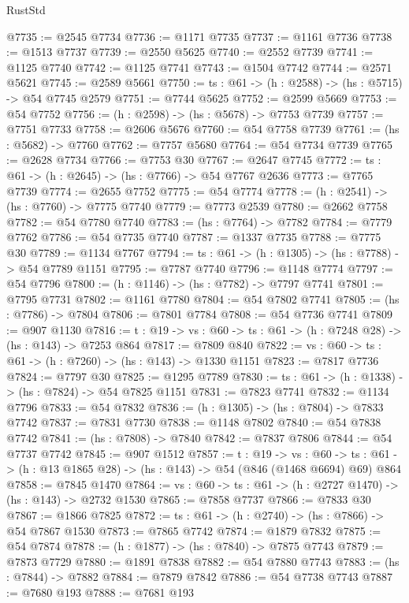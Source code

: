 \begin{lexlean}{RustStd}
\begin{coremodule}
@7735 := @2545 @7734
@7736 := @1171 @7735
@7737 := @1161 @7736
@7738 := @1513 @7737
@7739 := @2550 @5625
@7740 := @2552 @7739
@7741 := @1125 @7740
@7742 := @1125 @7741
@7743 := @1504 @7742
@7744 := @2571 @5621
@7745 := @2589 @5661
@7750 := {ts : @61} -> (h : @2588) -> (hs : @5715) -> @54 @7745 @2579
@7751 := @7744 @5625
@7752 := @2599 @5669
@7753 := @54 @7752
@7756 := (h : @2598) -> (hs : @5678) -> @7753 @7739
@7757 := @7751 @7733
@7758 := @2606 @5676
@7760 := @54 @7758 @7739
@7761 := (hs : @5682) -> @7760
@7762 := @7757 @5680
@7764 := @54 @7734 @7739
@7765 := @2628 @7734
@7766 := @7753 @30
@7767 := @2647 @7745
@7772 := {ts : @61} -> (h : @2645) -> (hs : @7766) -> @54 @7767 @2636
@7773 := @7765 @7739
@7774 := @2655 @7752
@7775 := @54 @7774
@7778 := (h : @2541) -> (hs : @7760) -> @7775 @7740
@7779 := @7773 @2539
@7780 := @2662 @7758
@7782 := @54 @7780 @7740
@7783 := (hs : @7764) -> @7782
@7784 := @7779 @7762
@7786 := @54 @7735 @7740
@7787 := @1337 @7735
@7788 := @7775 @30
@7789 := @1134 @7767
@7794 := {ts : @61} -> (h : @1305) -> (hs : @7788) -> @54 @7789 @1151
@7795 := @7787 @7740
@7796 := @1148 @7774
@7797 := @54 @7796
@7800 := (h : @1146) -> (hs : @7782) -> @7797 @7741
@7801 := @7795 @7731
@7802 := @1161 @7780
@7804 := @54 @7802 @7741
@7805 := (hs : @7786) -> @7804
@7806 := @7801 @7784
@7808 := @54 @7736 @7741
@7809 := @907 @1130
@7816 := {t : @19} -> {vs : @60} -> {ts : @61} -> (h : @7248 @28) -> (hs : @143) -> @7253 @864
@7817 := @7809 @840
@7822 := {vs : @60} -> {ts : @61} -> (h : @7260) -> (hs : @143) -> @1330 @1151
@7823 := @7817 @7736
@7824 := @7797 @30
@7825 := @1295 @7789
@7830 := {ts : @61} -> (h : @1338) -> (hs : @7824) -> @54 @7825 @1151
@7831 := @7823 @7741
@7832 := @1134 @7796
@7833 := @54 @7832
@7836 := (h : @1305) -> (hs : @7804) -> @7833 @7742
@7837 := @7831 @7730
@7838 := @1148 @7802
@7840 := @54 @7838 @7742
@7841 := (hs : @7808) -> @7840
@7842 := @7837 @7806
@7844 := @54 @7737 @7742
@7845 := @907 @1512
@7857 := {t : @19} ->
  {vs : @60} ->
  {ts : @61} -> (h : @13 @1865 @28) -> (hs : @143) -> @54 (@846 (@1468 @6694) @69) @864
@7858 := @7845 @1470
@7864 := {vs : @60} -> {ts : @61} -> (h : @2727 @1470) -> (hs : @143) -> @2732 @1530
@7865 := @7858 @7737
@7866 := @7833 @30
@7867 := @1866 @7825
@7872 := {ts : @61} -> (h : @2740) -> (hs : @7866) -> @54 @7867 @1530
@7873 := @7865 @7742
@7874 := @1879 @7832
@7875 := @54 @7874
@7878 := (h : @1877) -> (hs : @7840) -> @7875 @7743
@7879 := @7873 @7729
@7880 := @1891 @7838
@7882 := @54 @7880 @7743
@7883 := (hs : @7844) -> @7882
@7884 := @7879 @7842
@7886 := @54 @7738 @7743
@7887 := @7680 @193
@7888 := @7681 @193

\end{coremodule}
\end{lexlean}
